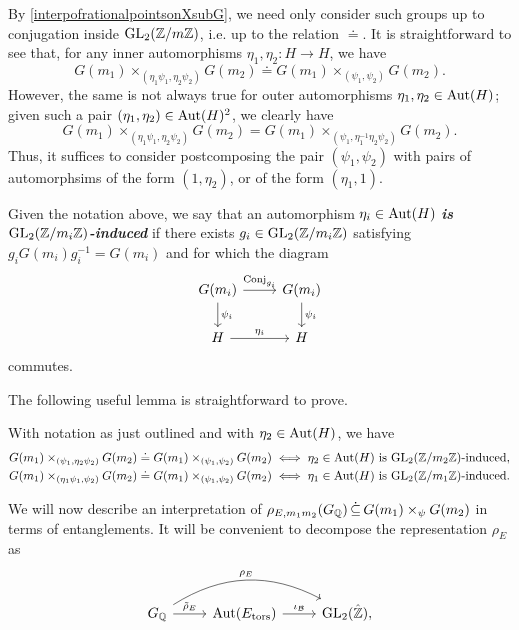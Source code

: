 By \eqref{interpofrationalpointsonXsubG}, we need only consider such groups up to conjugation inside $\operatorname{GL}_2(\mathbb{Z}/m\mathbb{Z})$, i.e. up to the relation $\doteq$.  It is straightforward to see that, for any inner automorphisms $\eta_1, \eta_2 : H \longrightarrow H$, we have
\[
G(m_1) \times_{(\eta_1\psi_1, \eta_2 \psi_2)} G(m_2) \doteq G(m_1) \times_{(\psi_1, \psi_2)} G(m_2).
\]
However, the same is not always true for outer automorphisms $\eta_1, \eta_2 \in \operatorname{Aut}(H)$; given such a pair $(\eta_1,\eta_2) \in \operatorname{Aut}(H)^2$, we clearly have
\[
G(m_1) \times_{(\eta_1 \psi_1, \eta_2 \psi_2)} G(m_2) = G(m_1) \times_{(\psi_1, \eta_1^{-1} \eta_2 \psi_2)} G(m_2).
\]
Thus, it suffices to consider postcomposing the pair $(\psi_1,\psi_2)$ with pairs of automorphsims of the form $(1,\eta_2)$, or of the form $(\eta_1,1)$.  
\begin{Definition} \label{defofGL2induced}
Given the notation above, we say that an automorphism $\eta_i \in \operatorname{Aut}(H)$ \emph{\textbf{is $\operatorname{GL}_2(\mathbb{Z}/m_i\mathbb{Z})$-induced}} if there exists $g_i \in \operatorname{GL}_2(\mathbb{Z}/m_i\mathbb{Z})$ satisfying $g_i G(m_i) g_i^{-1} = G(m_i)$ and for which the diagram
\[
\begin{tikzcd}
G(m_i) \rar{\conj_{g_i}} \dar{\psi_i} & G(m_i) \dar{\psi_i} \\
H \rar{\eta_i} & H
\end{tikzcd}
\]
commutes.  
\end{Definition}
The following useful lemma is straightforward to prove.
\begin{lemma} \label{GL2inducedlemma}
With notation as just outlined and with $\eta_2 \in \operatorname{Aut}(H)$, we have
\[
\begin{split}
&G(m_1) \times_{(\psi_1,\eta_2\psi_2)} G(m_2) \doteq G(m_1) \times_{(\psi_1,\psi_2)} G(m_2) \; \Longleftrightarrow \; \eta_2 \in \operatorname{Aut}(H) \text{ is $\operatorname{GL}_2(\mathbb{Z}/m_2\mathbb{Z})$-induced,} \\
&G(m_1) \times_{(\eta_1\psi_1,\psi_2)} G(m_2) \doteq G(m_1) \times_{(\psi_1,\psi_2)} G(m_2) \; \Longleftrightarrow \; \eta_1 \in \operatorname{Aut}(H) \text{ is $\operatorname{GL}_2(\mathbb{Z}/m_1\mathbb{Z})$-induced.} 
\end{split}
\]
\end{lemma}
We will now describe an interpretation of $\rho_{E,m_1m_2}(G_{\mathbb{Q}}) \, \dot\subseteq \, G(m_1) \times_\psi G(m_2)$ in terms of entanglements.  It will be convenient to decompose the representation $\rho_{E}$ as
\begin{equation*}
\begin{tikzcd}
G_\mbq \rar{\tilde{\rho}_{E}} \arrow[black, bend left]{rr}{\rho_E} & \aut(E_{\tors}) \rar{\iota_{\mc{B}}} & \GL_2(\hat{\mbz}),
\end{tikzcd}
\end{equation*}
